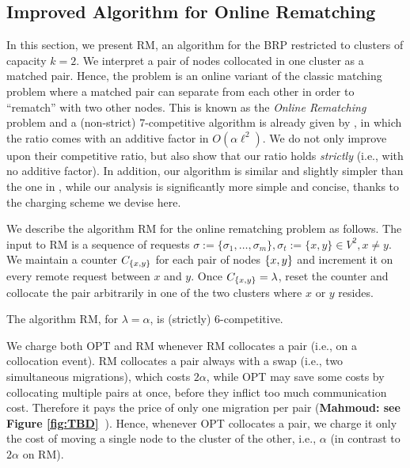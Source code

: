 \documentclass[a4paper,anonymous,USenglish]{lipics-v2019}
\newcommand{\OPT}{\textsf{OPT}\xspace}
\newcommand{\OBRP}{BRP\xspace}
\newcommand{\RM}{\textsf{RM}\xspace} %
\DeclarePairedDelimiter\set{\{}{\}}
\newcommand\mahmoud[1]{\color{orange}\textbf{Mahmoud: #1~}\color{black}}
\begin{document}
\subsection{Improved Algorithm for Online Rematching} \label{sec:k2}
In this section,
we present \RM,
 an algorithm for the \OBRP restricted to clusters of capacity $k=2$.
We interpret a pair of nodes collocated in one cluster as a matched pair.
Hence,
the problem is an online variant of the classic matching problem where
a matched pair can separate from each other in order to ``rematch'' with two other nodes.
This is known as the  \emph{Online Rematching} 
problem and a (non-strict) 7-competitive algorithm is already given by \cite{repartition-disc},
in which the ratio comes with an additive factor in $O(\alpha\ell^2)$.
We do not only improve upon their competitive ratio,
but also show that our ratio holds \emph{strictly}
(i.e., with no additive factor).
In addition,
our algorithm is similar
and slightly simpler than the one in \cite{repartition-disc}, 
while our analysis is significantly more simple and concise,
thanks to the charging scheme we devise here.


We describe the algorithm \RM for the online rematching problem as follows.
The input to \RM is a sequence of  requests
$\sigma:=\{\sigma_1,\dots, \sigma_m\}, \sigma_t:=\{x,y\} \in V^2, x \neq y$.
We maintain a counter $C_{\set{x,y}}$ for each pair of nodes $\set{x,y}$ and increment it on every remote request between $x$ and $y$.
Once $C_{\set{x,y}} = \lambda$,
reset the counter and collocate the pair arbitrarily in one of the two clusters where $x$ or $y$ resides.

\begin{theorem} \label{thm:k=2}
	The algorithm \RM, for $\lambda=\alpha$, is (strictly) 6-competitive.
\end{theorem}


We charge both \OPT and \RM whenever \RM collocates a pair (i.e., on a collocation event).
\RM collocates a pair always with a swap (i.e., two simultaneous migrations),
which  costs $2\alpha$,
while OPT may save some costs by collocating multiple pairs at once, 
 before they inflict too much communication cost.
 Therefore it pays the price of only one migration per pair  (\mahmoud{see Figure \ref{fig:TBD}}).
Hence,
whenever \OPT collocates a pair,
we charge it only the cost of moving a single node to the cluster of the other,
i.e., $\alpha$ (in contrast to $2\alpha$ on \RM).
\end{document}
